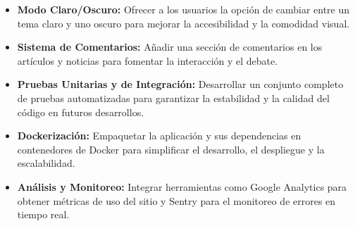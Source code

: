 \begin{itemize}
    \item \textbf{Modo Claro/Oscuro:} Ofrecer a los usuarios la opción de cambiar entre un tema claro y uno oscuro para mejorar la accesibilidad y la comodidad visual.

    \item \textbf{Sistema de Comentarios:} Añadir una sección de comentarios en los artículos y noticias para fomentar la interacción y el debate.

    \item \textbf{Pruebas Unitarias y de Integración:} Desarrollar un conjunto completo de pruebas automatizadas para garantizar la estabilidad y la calidad del código en futuros desarrollos.

    \item \textbf{Dockerización:} Empaquetar la aplicación y sus dependencias en contenedores de Docker para simplificar el desarrollo, el despliegue y la escalabilidad.

    \item \textbf{Análisis y Monitoreo:} Integrar herramientas como Google Analytics para obtener métricas de uso del sitio y Sentry para el monitoreo de errores en tiempo real.
\end{itemize}